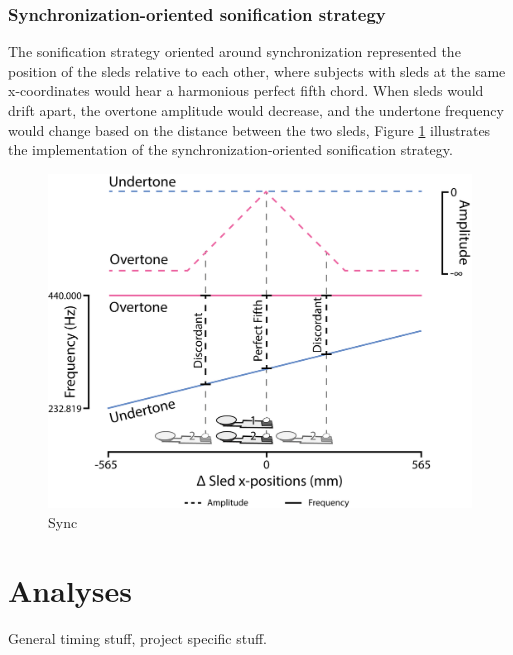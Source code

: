 \documentclass[10pt,a4paper,onecolumn]{article}
\begin{document}
\hypertarget{synchronization-oriented-sonification-strategy}{%
\subsubsection{Synchronization-oriented sonification strategy}\label{synchronization-oriented-sonification-strategy}}

The sonification strategy oriented around synchronization represented the position of the sleds relative to each other, where subjects with sleds at the same x-coordinates would hear a harmonious perfect fifth chord. When sleds would drift apart, the overtone amplitude would decrease, and the undertone frequency would change based on the distance between the two sleds, Figure \ref{fig:sync-illustration} illustrates the implementation of the synchronization-oriented sonification strategy.

\begin{figure}

{\centering \includegraphics[width=1\linewidth]{figures/sync_sonif_illustration} 

}

\caption{Sync}\label{fig:sync-illustration}
\end{figure}

\hypertarget{analyses}{%
\section{Analyses}\label{analyses}}

General timing stuff, project specific stuff.
\end{document}
